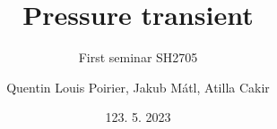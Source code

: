

\title[APROS simulations of BWR transients]{Pressure transient}
\subtitle{First seminar SH2705}
\author{Quentin Louis Poirier, Jakub Mátl, Atilla Cakir}
\date[24/05/23]{123. 5. 2023}
\usepackage{comment}

\usepackage[style=authoryear-ibid,backend=biber]{biblatex}
\usepackage{pgfplots}
\pgfplotsset{compat=1.18}



\nologo %




\frame{\titlepage}


